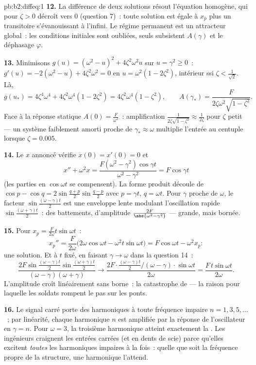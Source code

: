 \begin{solution}{pb:b2:diffeq:1}
\textbf{12.} La différence de deux solutions résout l'équation
homogène, qui pour $\zeta > 0$ décroît vers $0$
(question 7)~: toute solution est égale à $x_p$ plus un transitoire
s'évanouissant à l'infini. Le régime permanent est un attracteur
global~: les conditions initiales sont oubliées, seuls subsistent
$A(\gamma)$ et le déphasage $\varphi$.

\textbf{13.} Minimisons $g(u) = (\omega^2 - u)^2 +
4\zeta^2\omega^2u$ sur $u = \gamma^2 \geq 0$~: $g'(u) =
-2(\omega^2 - u) + 4\zeta^2\omega^2 = 0$ en $u = \omega^2(1 -
2\zeta^2)$, intérieur ssi $\zeta < \frac{1}{\sqrt2}$. Là,
\[
g(u_*) = 4\zeta^4\omega^4 + 4\zeta^2\omega^4(1 - 2\zeta^2)
= 4\zeta^2\omega^4(1 - \zeta^2),
\qquad
A(\gamma_*) = \frac{F}{2\zeta\omega^2\sqrt{1 - \zeta^2}} .
\]
Face à la réponse statique $A(0) = \frac{F}{\omega^2}$~:
amplification $\frac{1}{2\zeta\sqrt{1-\zeta^2}} \approx
\frac{1}{2\zeta}$ pour $\zeta$ petit --- un système faiblement
amorti proche de $\gamma_* \approx \omega$ multiplie l'entrée au
centuple lorsque $\zeta = 0.005$.

\textbf{14.} Le $x$ annoncé vérifie $x(0) = x'(0) = 0$ et
\[
x'' + \omega^2 x = \frac{F(\omega^2 -
\gamma^2)\cos\gamma t}{\omega^2 - \gamma^2} = F\cos\gamma t
\]
(les parties en $\cos\omega t$ se compensent). La forme produit
découle de $\cos p - \cos q = 2\sin\frac{q+p}{2}\sin\frac{q-p}2$
avec $p = \gamma t$, $q = \omega t$. Pour $\gamma$ proche de
$\omega$, le facteur $\sin\frac{(\omega-\gamma)t}2$ est une
enveloppe lente modulant l'oscillation rapide
$\sin\frac{(\omega+\gamma)t}2$~: des battements, d'amplitude
$\frac{2F}{\abs{\omega^2-\gamma^2}}$ --- grande, mais bornée.

\textbf{15.} Pour $x_p = \frac{F}{2\omega}t\sin\omega t$~:
\[
x_p'' = \frac{F}{2\omega}\bigl(2\omega\cos\omega t -
\omega^2t\sin\omega t\bigr)
= F\cos\omega t - \omega^2x_p :
\]
une solution. Et à $t$ fixé, en faisant $\gamma \to \omega$ dans
la question 14~:
\[
\frac{2F\sin\frac{(\omega-\gamma)t}2
\sin\frac{(\omega+\gamma)t}{2}}
{(\omega-\gamma)(\omega+\gamma)}
\longrightarrow
\frac{2F\cdot\frac{(\omega-\gamma)t}2\big/(\omega-\gamma)
\cdot\sin\omega t}{2\omega}
= \frac{F\,t\sin\omega t}{2\omega} .
\]
L'amplitude croît linéairement sans borne~: la catastrophe de
 --- la raison pour laquelle les soldats rompent le pas
sur les ponts.

\textbf{16.} Le signal carré porte des harmoniques à toute
fréquence impaire $n = 1, 3, 5, \dots$~; par linéarité, chaque
harmonique $n$ est amplifiée par la réponse de l'oscillateur en
$\gamma = n$. Pour $\omega = 3$, la troisième harmonique atteint
exactement la . Les ingénieurs craignent les entrées
carrées (et en dents de scie) parce qu'elles excitent \emph{toutes}
les harmoniques impaires à la fois~: quelle que soit la fréquence
propre de la structure, une harmonique l'attend.


\end{solution}
